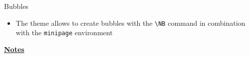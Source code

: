 \documentclass[10pt]{beamer}
\begin{document}
\begin{frame}
	{Bubbles}
	\begin{itemize}
		\item The theme allows to create bubbles with the \texttt{\textbackslash NB} command in combination with the \texttt{minipage} environment \bigskip
	\end{itemize}
	\begin{center}
		\begin{minipage}{.4\textwidth}
		\end{minipage}
	\end{center}
	\begin{center}
		\begin{minipage}{.6\textwidth}
		\end{minipage}
	\end{center}
	\begin{center}
		\begin{minipage}{.8\textwidth}
		\end{minipage}
	\end{center}
\end{frame}
\begin{flushleft}
	\underline{\textbf{Notes}}\setlength{\parskip}{.15cm}\notesize\newline\par
\end{flushleft}
\end{document}
